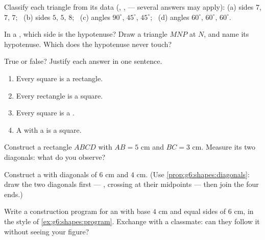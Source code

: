 \begin{exercise}[$\star$]\label{exo:g6:shapes:4}
Classify each triangle from its data (, ,
 --- several answers may apply):
(a) sides $7$, $7$, $7$; \
(b) sides $5$, $5$, $8$; \
(c) angles $90^\circ$, $45^\circ$, $45^\circ$; \
(d) angles $60^\circ$, $60^\circ$, $60^\circ$.
\end{exercise}

\begin{exercise}[$\star$]\label{exo:g6:shapes:5}
In a , which side is the hypotenuse? Draw a triangle
$MNP$  at $N$, and name its hypotenuse. Which  does
the hypotenuse never touch?
\end{exercise}

\begin{exercise}[$\star$]\label{exo:g6:shapes:6}
True or false? Justify each answer in one sentence.
\begin{enumerate}
  \item Every square is a rectangle.
  \item Every rectangle is a square.
  \item Every square is a .
  \item A  with a  is a square.
\end{enumerate}
\end{exercise}

\begin{exercise}[$\star$]\label{exo:g6:shapes:7}
Construct a rectangle $ABCD$ with $AB = 5$ cm and $BC = 3$ cm. Measure
its two diagonals: what do you observe?
\end{exercise}

\begin{exercise}[$\star$]\label{exo:g6:shapes:8}
Construct a  with diagonals of $6$ cm and $4$ cm. (Use
\cref{prop:g6:shapes:diagonals}: draw the two diagonals first ---
\omterm{def:g6:lines:perp}{perpendicular}, crossing at their midpoints --- then join the four
ends.)
\end{exercise}

\begin{exercise}[$\star\star$]\label{exo:g6:shapes:9}
Write a construction program for an  with base
$4$ cm and equal sides of $6$ cm, in the style of
\cref{ex:g6:shapes:program}. Exchange with a classmate: can they follow
it without seeing your figure?
\end{exercise}


